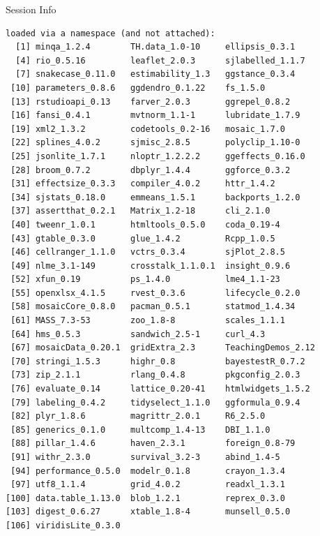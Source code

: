 \documentclass[10pt]{beamer}\usepackage[]{graphicx}\usepackage[]{color}
\makeatletter
\newenvironment{kframe}{%
 \def\at@end@of@kframe{}%
 \ifinner\ifhmode%
  \def\at@end@of@kframe{\end{minipage}}%
  \begin{minipage}{\columnwidth}%
 \fi\fi%
 \def\FrameCommand##1{\hskip\@totalleftmargin \hskip-\fboxsep
 \colorbox{shadecolor}{##1}\hskip-\fboxsep
     \hskip-\linewidth \hskip-\@totalleftmargin \hskip\columnwidth}%
 \MakeFramed {\advance\hsize-\width
   \@totalleftmargin\z@ \linewidth\hsize
   \@setminipage}}%
 {\par\unskip\endMakeFramed%
 \at@end@of@kframe}
\newenvironment{knitrout}{}{} %
\makeatother
\begin{document}
\begin{frame}[fragile]{Session Info}
\begin{knitrout}
\begin{kframe}
\begin{verbatim}
loaded via a namespace (and not attached):
  [1] minqa_1.2.4        TH.data_1.0-10     ellipsis_0.3.1    
  [4] rio_0.5.16         leaflet_2.0.3      sjlabelled_1.1.7  
  [7] snakecase_0.11.0   estimability_1.3   ggstance_0.3.4    
 [10] parameters_0.8.6   ggdendro_0.1.22    fs_1.5.0          
 [13] rstudioapi_0.13    farver_2.0.3       ggrepel_0.8.2     
 [16] fansi_0.4.1        mvtnorm_1.1-1      lubridate_1.7.9   
 [19] xml2_1.3.2         codetools_0.2-16   mosaic_1.7.0      
 [22] splines_4.0.2      sjmisc_2.8.5       polyclip_1.10-0   
 [25] jsonlite_1.7.1     nloptr_1.2.2.2     ggeffects_0.16.0  
 [28] broom_0.7.2        dbplyr_1.4.4       ggforce_0.3.2     
 [31] effectsize_0.3.3   compiler_4.0.2     httr_1.4.2        
 [34] sjstats_0.18.0     emmeans_1.5.1      backports_1.2.0   
 [37] assertthat_0.2.1   Matrix_1.2-18      cli_2.1.0         
 [40] tweenr_1.0.1       htmltools_0.5.0    coda_0.19-4       
 [43] gtable_0.3.0       glue_1.4.2         Rcpp_1.0.5        
 [46] cellranger_1.1.0   vctrs_0.3.4        sjPlot_2.8.5      
 [49] nlme_3.1-149       crosstalk_1.1.0.1  insight_0.9.6     
 [52] xfun_0.19          ps_1.4.0           lme4_1.1-23       
 [55] openxlsx_4.1.5     rvest_0.3.6        lifecycle_0.2.0   
 [58] mosaicCore_0.8.0   pacman_0.5.1       statmod_1.4.34    
 [61] MASS_7.3-53        zoo_1.8-8          scales_1.1.1      
 [64] hms_0.5.3          sandwich_2.5-1     curl_4.3          
 [67] mosaicData_0.20.1  gridExtra_2.3      TeachingDemos_2.12
 [70] stringi_1.5.3      highr_0.8          bayestestR_0.7.2  
 [73] zip_2.1.1          rlang_0.4.8        pkgconfig_2.0.3   
 [76] evaluate_0.14      lattice_0.20-41    htmlwidgets_1.5.2 
 [79] labeling_0.4.2     tidyselect_1.1.0   ggformula_0.9.4   
 [82] plyr_1.8.6         magrittr_2.0.1     R6_2.5.0          
 [85] generics_0.1.0     multcomp_1.4-13    DBI_1.1.0         
 [88] pillar_1.4.6       haven_2.3.1        foreign_0.8-79    
 [91] withr_2.3.0        survival_3.2-3     abind_1.4-5       
 [94] performance_0.5.0  modelr_0.1.8       crayon_1.3.4      
 [97] utf8_1.1.4         grid_4.0.2         readxl_1.3.1      
[100] data.table_1.13.0  blob_1.2.1         reprex_0.3.0      
[103] digest_0.6.27      xtable_1.8-4       munsell_0.5.0     
[106] viridisLite_0.3.0 
\end{verbatim}
\end{kframe}
\end{knitrout}
	
\end{frame}
\end{document}
